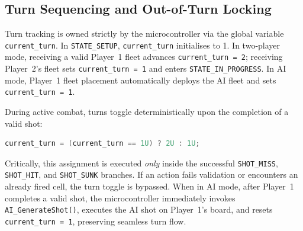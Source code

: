 \subsection{Turn Sequencing and Out-of-Turn Locking}
Turn tracking is owned strictly by the microcontroller via the global variable \texttt{current\_turn}. In \texttt{STATE\_SETUP}, \texttt{current\_turn} initialises to 1. In two-player mode, receiving a valid Player~1 fleet advances \texttt{current\_turn = 2}; receiving Player~2's fleet sets \texttt{current\_turn = 1} and enters \texttt{STATE\_IN\_PROGRESS}. In AI mode, Player~1 fleet placement automatically deploys the AI fleet and sets \texttt{current\_turn = 1}.

During active combat, turns toggle deterministically upon the completion of a valid shot:
\begin{lstlisting}[language=C]
current_turn = (current_turn == 1U) ? 2U : 1U;
\end{lstlisting}
Critically, this assignment is executed \textit{only} inside the successful \texttt{SHOT\_MISS}, \texttt{SHOT\_HIT}, and \texttt{SHOT\_SUNK} branches. If an action fails validation or encounters an already fired cell, the turn toggle is bypassed. When in AI mode, after Player~1 completes a valid shot, the microcontroller immediately invokes \texttt{AI\_GenerateShot()}, executes the AI shot on Player~1's board, and resets \texttt{current\_turn = 1}, preserving seamless turn flow.

